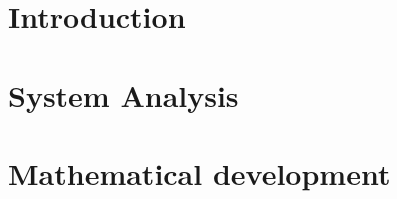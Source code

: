 \documentclass[12pt, twoside]{report}
\begin{document}


\begingroup
  \pagestyle{empty}
  \cleardoublepage%
\endgroup

\tableofcontents

\begingroup
  \pagestyle{empty}
  \cleardoublepage%
\endgroup

\listoffigures

\begingroup
  \pagestyle{empty}
  \cleardoublepage%
\endgroup

\chapter{Introduction}


\chapter{System Analysis}


\chapter{Mathematical development}


\printbibliography%
\nocite{*}
\end{document}
